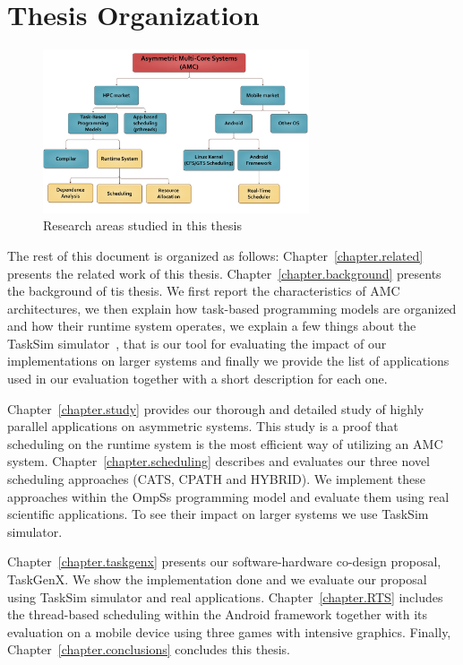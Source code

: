 \section{Thesis Organization}
\begin{figure}[t]%
	\centering
	\includegraphics[width=0.7\textwidth]{figures/research_areas.pdf}
	\caption{Research areas studied in this thesis}
	\label{fig:research_areas}
\end{figure}
The rest of this document is organized as follows: 
Chapter~\ref{chapter.related} presents the related work of this thesis.
Chapter~\ref{chapter.background} presents the background of tis thesis.
We first report the characteristics of AMC architectures, we then explain how task-based programming models are organized and how their runtime system operates, we explain a few things about the TaskSim simulator~\cite{AbstrLevels_TACO12}, that is our tool for evaluating the impact of our implementations on larger systems and finally we provide the list of applications used in our evaluation together with a short description for each one.

Chapter~\ref{chapter.study} provides our thorough and detailed study of highly parallel applications on asymmetric systems.
This study is a proof that scheduling on the runtime system is the most efficient way of utilizing an AMC system.
Chapter~\ref{chapter.scheduling} describes and evaluates our three novel scheduling approaches (CATS, CPATH and HYBRID). 
We implement these approaches within the OmpSs programming model and evaluate them using real scientific applications.
To see their impact on larger systems we use TaskSim simulator.

Chapter~\ref{chapter.taskgenx} presents our software-hardware co-design proposal, TaskGenX.
We show the implementation done and we evaluate our proposal using TaskSim simulator and real applications.
Chapter~\ref{chapter.RTS} includes the thread-based scheduling within the Android framework together with its evaluation on a mobile device using three games with intensive graphics.
Finally, Chapter~\ref{chapter.conclusions} concludes this thesis.

